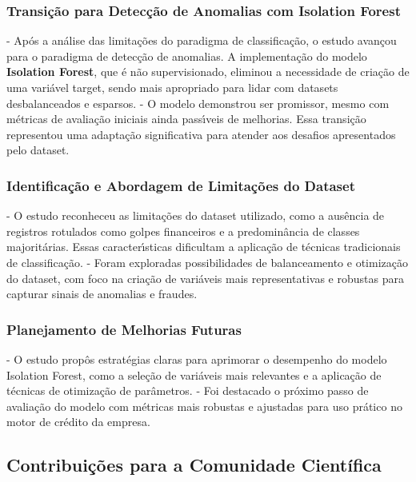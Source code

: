 \documentclass[12pt,a4paper]{article}
\begin{document}
\subsubsection{Transi\c{c}\~{a}o para Detec\c{c}\~{a}o de Anomalias com Isolation Forest}
- Ap\'os a an\'alise das limita\c{c}\~{o}es do paradigma de classifica\c{c}\~{a}o, o estudo avan\c{c}ou para o paradigma de detec\c{c}\~{a}o de anomalias. A implementa\c{c}\~{a}o do modelo \textbf{Isolation Forest}, que \'{e} n\~{a}o supervisionado, eliminou a necessidade de cria\c{c}\~{a}o de uma vari\'{a}vel target, sendo mais apropriado para lidar com datasets desbalanceados e esparsos.
- O modelo demonstrou ser promissor, mesmo com m\'etricas de avalia\c{c}\~{a}o iniciais ainda pass\'{\i}veis de melhorias. Essa transi\c{c}\~{a}o representou uma adapta\c{c}\~{a}o significativa para atender aos desafios apresentados pelo dataset.

\subsubsection{Identifica\c{c}\~{a}o e Abordagem de Limita\c{c}\~{o}es do Dataset}
- O estudo reconheceu as limita\c{c}\~{o}es do dataset utilizado, como a aus\^{e}ncia de registros rotulados como golpes financeiros e a predomin\^ancia de classes majorit\'arias. Essas caracter\'{\i}sticas dificultam a aplica\c{c}\~{a}o de t\'ecnicas tradicionais de classifica\c{c}\~{a}o.
- Foram exploradas possibilidades de balanceamento e otimiza\c{c}\~{a}o do dataset, com foco na cria\c{c}\~{a}o de vari\'{a}veis mais representativas e robustas para capturar sinais de anomalias e fraudes.

\subsubsection{Planejamento de Melhorias Futuras}
- O estudo prop\^os estrat\'egias claras para aprimorar o desempenho do modelo Isolation Forest, como a sele\c{c}\~{a}o de vari\'{a}veis mais relevantes e a aplica\c{c}\~{a}o de t\'ecnicas de otimiza\c{c}\~{a}o de par\^ametros.
- Foi destacado o pr\'oximo passo de avalia\c{c}\~{a}o do modelo com m\'etricas mais robustas e ajustadas para uso pr\'atico no motor de cr\'edito da empresa.

\subsection{Contribui\c{c}\~{o}es para a Comunidade Cient\'ifica}
\end{document}
